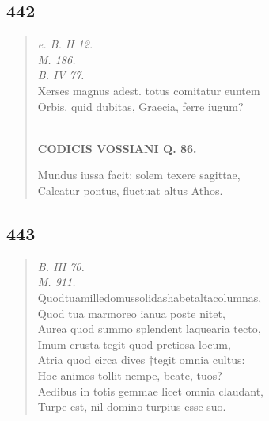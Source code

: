 \documentclass[11pt, a4paper]{report}
\begin{document}
            \subsection*{442}
      \begin{verse}
      \textit{e. B. II 12.} \\ \textit{M. 186.} \\ \textit{B. IV 77.} \\ Xerses magnus adest. totus comitatur euntem \\ Orbis. quid dubitas, Graecia, ferre iugum? \\ 
        ﻿\pagebreak 
    \begin{center} \textbf{CODICIS VOSSIANI Q. 86.} \end{center}Mundus iussa facit: solem texere sagittae, \\ Calcatur pontus, fluctuat altus Athos. \\ 
      \end{verse}
  
            \subsection*{443}
      \begin{verse}
      \textit{B. III 70.} \\ \textit{M. 911.} \\ Quodtuamilledomussolidashabetaltacolumnas, \\ Quod tua marmoreo ianua poste nitet, \\ Aurea quod summo splendent laquearia tecto, \\ Imum crusta tegit quod pretiosa locum, \\ Atria quod circa dives †tegit omnia cultus: \\ Hoc animos tollit nempe, beate, tuos? \\ Aedibus in totis gemmae licet omnia claudant, \\ Turpe est, nil domino turpius esse suo. \\ 
      \end{verse}
  
\end{document}

